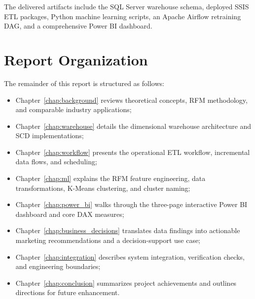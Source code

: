 The delivered artifacts include the SQL Server warehouse schema, deployed SSIS ETL packages, Python machine learning scripts, an Apache Airflow retraining DAG, and a comprehensive Power BI dashboard.

\section{Report Organization}
The remainder of this report is structured as follows:
\begin{itemize}
  \item Chapter~\ref{chap:background} reviews theoretical concepts, RFM methodology, and comparable industry applications;
  \item Chapter~\ref{chap:warehouse} details the dimensional warehouse architecture and SCD implementations;
  \item Chapter~\ref{chap:workflow} presents the operational ETL workflow, incremental data flows, and scheduling;
  \item Chapter~\ref{chap:ml} explains the RFM feature engineering, data transformations, K-Means clustering, and cluster naming;
  \item Chapter~\ref{chap:power_bi} walks through the three-page interactive Power BI dashboard and core DAX measures;
  \item Chapter~\ref{chap:business_decisions} translates data findings into actionable marketing recommendations and a decision-support use case;
  \item Chapter~\ref{chap:integration} describes system integration, verification checks, and engineering boundaries;
  \item Chapter~\ref{chap:conclusion} summarizes project achievements and outlines directions for future enhancement.
\end{itemize}
